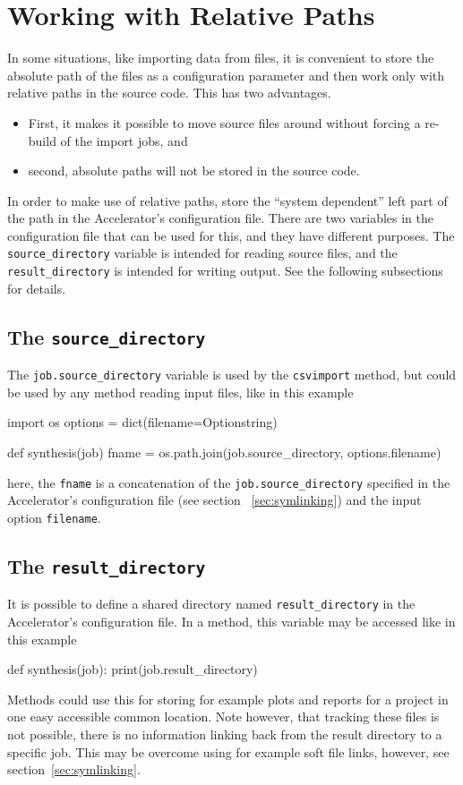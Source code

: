 \section{Working with Relative Paths}
In some situations, like importing data from files, it is convenient
to store the absolute path of the files as a configuration parameter
and then work only with relative paths in the source code.  This has
two advantages.
\begin{itemize}
\item[] First, it makes it possible to move source files around without
forcing a re-build of the import jobs, and
\item[] second, absolute paths will not be stored in the source code.
\end{itemize}
In order to make use of relative paths, store the ``system dependent''
left part of the path in the Accelerator's configuration file.  There
are two variables in the configuration file that can be used for this,
and they have different purposes.  The \texttt{source\_directory}
variable is intended for reading source files, and
the \texttt{result\_directory} is intended for writing output.  See
the following subsections for details.


\subsection{The \texttt{source\_directory}}
\label{sec:SOURCE_DIR}
The \texttt{job.source\_directory} variable is used by the
\texttt{csvimport} method, but could be used by any method reading
input files, like in this example
\begin{python}
import os
options = dict(filename=Optionstring)

def synthesis(job)
    fname = os.path.join(job.source_directory, options.filename)
\end{python}
here, the \texttt{fname} is a concatenation of the
\texttt{job.source\_directory} specified in the Accelerator's
configuration file (see section ~\ref{sec:symlinking}) and the input
option \texttt{filename}.


\subsection{The \texttt{result\_directory}}
\label{sec:RESULT_DIR}
It is possible to define a shared directory
named \texttt{result\_directory} in the Accelerator's configuration
file.  In a method, this variable may be accessed like in this example
\begin{python}
def synthesis(job):
    print(job.result_directory)
\end{python}
Methods could use this for storing for example plots and reports for a
project in one easy accessible common location.  Note however, that
tracking these files is not possible, there is no information linking
back from the result directory to a specific job.  This may be
overcome using for example soft file links, however, see
section~\ref{sec:symlinking}.
